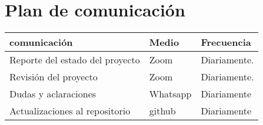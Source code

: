 \documentclass[12pt,a4paper]{article}
\begin{document}
\section{Plan de comunicación}
\vspace{0.5 cm}
\begin{table}[h!]
\begin{tabular}{|p{5 cm}|p{5 cm}|p{5 cm}|}
\hline
\textbf{comunicación}&\textbf{Medio}&\textbf{Frecuencia}
\\\hline
Reporte del estado del proyecto&Zoom&Diariamente.\\\hline
Revisión del proyecto &Zoom&Diariamente.\\\hline
Dudas y aclaraciones&Whatsapp&Diariamente\\\hline
Actualizaciones al repositorio&github&Diariamente\\\hline
\end{tabular}
\end{table}
\end{document}
